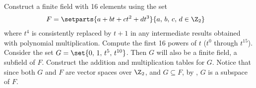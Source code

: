 Construct a finite field with 16 elements using the set
%
\begin{align*}
F&=\setparts{a+bt+ct^2+dt^3}{a,\,b,\,c,\,d\in\Z_2}
\end{align*}
%
where $t^4$ is consistently replaced by $t+1$ in any intermediate results obtained with polynomial multiplication.  Compute the first 16 powers of $t$ ($t^0$ through $t^{15}$).    Consider the set $G=\set{0,\,1,\,t^5,\,t^{10}}$.  Then $G$ will also be a finite field, a subfield of $F$.  Construct the addition and multiplication tables for $G$.  Notice that since both $G$ and $F$ are vector spaces over $\Z_2$, and $G\subseteq F$, by , $G$ is a subspace of $F$.
